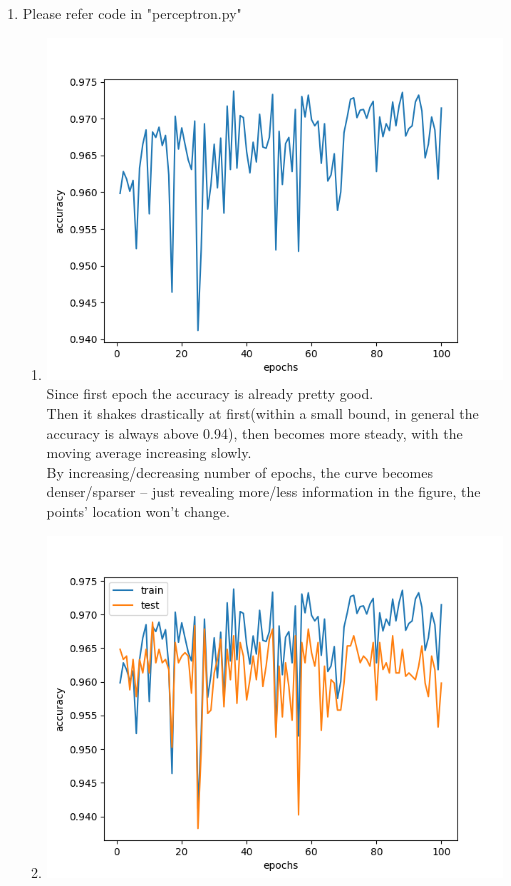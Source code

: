 \documentclass[11pt, oneside]{article}   	%
\begin{document}
\begin{enumerate}
\item	%
  Please refer code in "perceptron.py"
  \begin{enumerate}
  \item	%
    \includegraphics[width=15cm]{2_1a.png}\\
    Since first epoch the accuracy is already pretty good.\\
    Then it shakes drastically at first(within a small bound, in general the accuracy is always above 0.94), then becomes more steady, with the moving average increasing slowly.\\
    By increasing/decreasing number of epochs, the curve becomes denser/sparser -- just revealing more/less information in the figure, the points' location won't change.
  \item	%
    \includegraphics[width=15cm]{2_1b.png}\\

\end{enumerate}
\end{enumerate}
\end{document}

